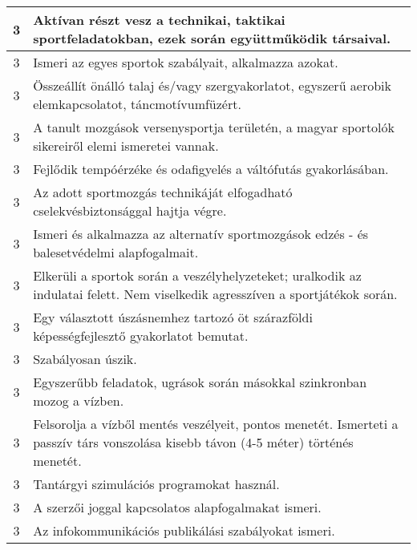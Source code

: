 \begin{longtable}{c | p{12cm} }
                                
                                          3 &  Aktívan részt vesz a technikai, taktikai sportfeladatokban, ezek során együttműködik társaival. \\ \hline
                                          3 &  Ismeri az egyes sportok szabályait, alkalmazza azokat. \\ \hline
                                          3 &  Összeállít önálló talaj és/vagy szergyakorlatot, egyszerű aerobik elemkapcsolatot, táncmotívumfüzért. \\ \hline
                                          3 &  A tanult mozgások versenysportja területén, a magyar sportolók sikereiről elemi ismeretei vannak. \\ \hline
                                          3 &  Fejlődik tempóérzéke és odafigyelés a váltófutás gyakorlásában. \\ \hline
                                          3 &  Az adott sportmozgás technikáját elfogadható cselekvésbiztonsággal hajtja végre. \\ \hline
                                          3 &  Ismeri és alkalmazza az alternatív sportmozgások edzés - és balesetvédelmi alapfogalmait. \\ \hline
                                          3 &  Elkerüli a sportok során a veszélyhelyzeteket; uralkodik az indulatai felett. Nem viselkedik agresszíven a sportjátékok során. \\ \hline
                                          3 &  Egy választott úszásnemhez tartozó öt szárazföldi képességfejlesztő gyakorlatot bemutat. \\ \hline
                                          3 &  Szabályosan úszik. \\ \hline
                                          3 &  Egyszerűbb feladatok, ugrások során másokkal szinkronban mozog a vízben. \\ \hline
                                          3 &  Felsorolja a vízből mentés veszélyeit, pontos menetét. Ismerteti a passzív társ vonszolása kisebb távon (4-5 méter) történés menetét. \\ \hline
                                          3 &  Tantárgyi szimulációs programokat használ. \\ \hline
                                          3 &  A szerzői joggal kapcsolatos alapfogalmakat ismeri. \\ \hline
                                          3 &  Az infokommunikációs publikálási szabályokat ismeri. \\ \hline

\end{longtable}
